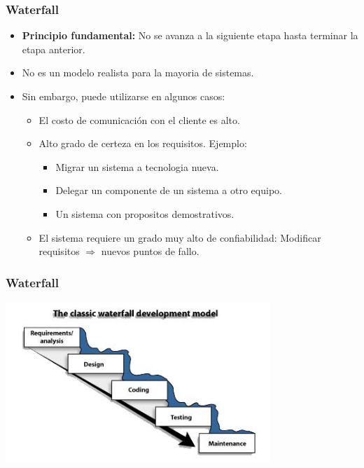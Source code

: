 \documentclass{beamer}
\begin{document}
\begin{frame}
    \frametitle{Waterfall}
    \begin{itemize}
    \item{{\bf Principio fundamental:} No se avanza a la
        siguiente etapa hasta terminar la etapa anterior.}
    \item{No es un modelo realista para la mayoria de sistemas.}
    \item{Sin embargo, puede utilizarse en algunos casos:
        \begin{itemize}
            \item{El costo de comunicaci\'on con el cliente es alto.}
            \item{Alto grado de certeza en los requisitos. Ejemplo:
                \begin{itemize}
                    \item{Migrar un sistema a tecnologia nueva.}
                    \item{Delegar un componente de un sistema a otro equipo.}
                    \item{Un sistema con propositos demostrativos.}
                \end{itemize}
            }
            \item{El sistema requiere un grado muy alto de confiabilidad: Modificar requisitos $\Rightarrow$ nuevos puntos de fallo.}
        \end{itemize}
    }
    \end{itemize}
\end{frame}

\begin{frame}
    \frametitle{Waterfall}
    \begin{center}
    \includegraphics[width=10cm]{waterfall.jpg}
    \end{center}
\end{frame}
\end{document}
